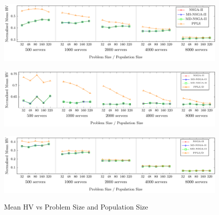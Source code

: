 \begin{figure}[t]
    \begin{minipage}{\textwidth}
        \hspace*{-2.1em}
        \includegraphics[width=1.05\textwidth]{figures/graphs/fat_tree_hv}
        \vspace{1em}

        \label{fig:ft_hv}
    \end{minipage}

    \begin{minipage}{\textwidth}
        \hspace*{-2.1em}
        \includegraphics[width=1.05\textwidth]{figures/graphs/dcell_hv}
        \vspace{1em}

        \label{fig:dc_hv}
    \end{minipage}

    \begin{minipage}{\textwidth}
        \hspace*{-2.1em}
        \includegraphics[width=1.05\textwidth]{figures/graphs/leaf_spine_hv}
        \vspace{1em}

        \label{fig:ls_hv}
    \end{minipage}

    \caption{Mean HV vs Problem Size and Population Size}
    \label{fig:hv}
\end{figure}

